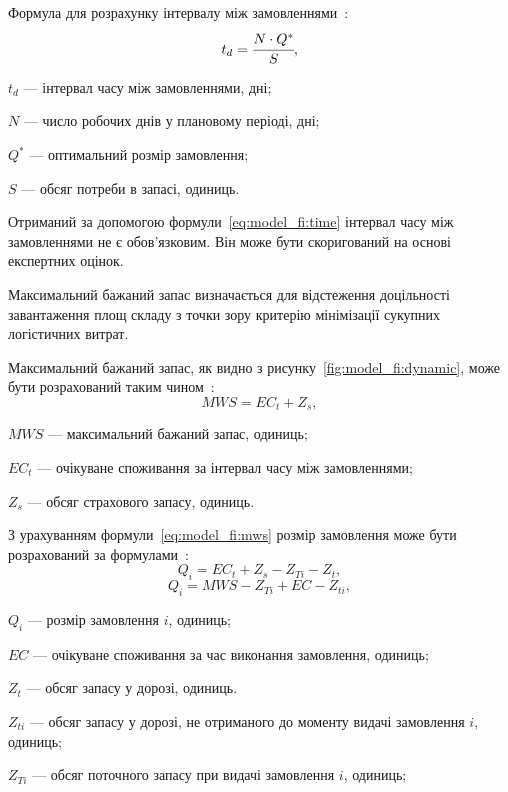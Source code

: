 Формула для розрахунку інтервалу між замовленнями~\cite{Sterligova2008}:
\begin{equation} \label{eq:model_fi:time}
t_d=\cfrac{N\cdot Q^*}{S}
,
\end{equation}
\begin{description}
	\item[де] $t_d$ --- інтервал часу між замовленнями, дні;
	\item $N$ --- число робочих днів у плановому періоді, дні;
	\item $Q^*$ --- оптимальний розмір замовлення;
	\item $S$ --- обсяг потреби в запасі, одиниць.
\end{description}

Отриманий за допомогою формули~\eqref{eq:model_fi:time} інтервал часу між замовленнями не є обов'язковим.
Він може бути скоригований на основі експертних оцінок.

Максимальний бажаний запас визначається для відстеження доцільності завантаження площ складу з точки зору критерію мінімізації сукупних логістичних витрат.

Максимальний бажаний запас, як видно з рисунку~\ref{fig:model_fi:dynamic}, може бути розрахований таким чином~\cite{Sterligova2008}:
\begin{equation} \label{eq:model_fi:mws}
MWS=EC_t+Z_s
,
\end{equation}
\begin{description}
	\item[де] $MWS$ --- максимальний бажаний запас, одиниць;
	\item $EC_t$ --- очікуване споживання за інтервал часу між замовленнями;
	\item $Z_s$ --- обсяг страхового запасу, одиниць.
\end{description}

З урахуванням формули~\eqref{eq:model_fi:mws} розмір замовлення може бути розрахований за формулами~\cite{Sterligova2008}:
\begin{equation} \label{eq:order}
Q_i=EC_t+Z_s-Z_{Ti}-Z_t
,
\end{equation}
\begin{equation} \label{eq:order2}
Q_i=MWS-Z_{Ti}+EC-Z_{ti}
,
\end{equation}
\begin{description}
	\item[де] $Q_i$ --- розмір замовлення $i$, одиниць;
	\item $EC$ --- очікуване споживання за час виконання замовлення, одиниць;
	\item $Z_t$ --- обсяг запасу у дорозі, одиниць.
	\item $Z_{ti}$ --- обсяг запасу у дорозі, не отриманого до моменту видачі замовлення $i$, одиниць;
	\item $Z_{Ti}$ --- обсяг поточного запасу при видачі замовлення $i$, одиниць;
\end{description}

